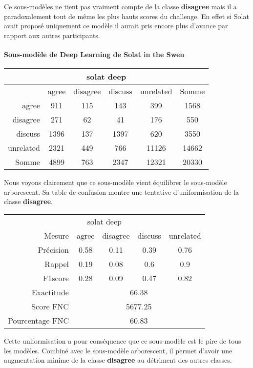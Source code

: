 Ce sous-modèles ne tient pas vraiment compte de la classe \textbf{disagree} mais il a paradoxalement tout de même les plus hauts scores du challenge. En effet si Solat avait proposé uniquement ce modèle il aurait pris encore plus  d'avance par rapport aux autres participants.
\paragraph{Sous-modèle de Deep Learning de Solat in the Swen}
\begin{center}
 \begin{tabular}{ r | c c c c | c }
  \multicolumn{6}{c}{solat deep}\\
  \hline
            & agree & disagree & discuss & unrelated & Somme \\
  \hline
  agree     & 911   & 115      & 143     & 399       & 1568  \\
  disagree  & 271   & 62       & 41      & 176       & 550   \\
  discuss   & 1396  & 137      & 1397    & 620       & 3550  \\
  unrelated & 2321  & 449      & 766     & 11126     & 14662 \\
  \hline
  Somme     & 4899  & 763      & 2347    & 12321     & 20330 \\
 \end{tabular}
\end{center}



Nous voyons clairement que ce sous-modèle vient équilibrer le sous-modèle arborescent. Sa table de confusion montre une tentative d'uniformisation de la classe \textbf{disagree}.
\begin{center}
 \begin{tabular}{ r | c c c c }
  \multicolumn{5}{c}{solat deep}\\
  Mesure     & agree & disagree & discuss & unrelated \\
  \hline
  Précision & 0.58  & 0.11     & 0.39    & 0.76      \\
  Rappel     & 0.19  & 0.08     & 0.6     & 0.9       \\
  F1score    & 0.28  & 0.09     & 0.47    & 0.82      \\
  \hline
  \hline
  Exactitude & \multicolumn{4}{c}{66.38}\\
  Score FNC & \multicolumn{4}{c}{5677.25}\\
  Pourcentage FNC & \multicolumn{4}{c}{60.83}\\
 \end{tabular}
\end{center}


Cette uniformisation a pour conséquence que ce sous-modèle est le pire de tous les modèles. Combiné avec le sous-modèle arborescent, il permet d'avoir une augmentation minime de la classe \textbf{disagree} au détriment des autres classes.
